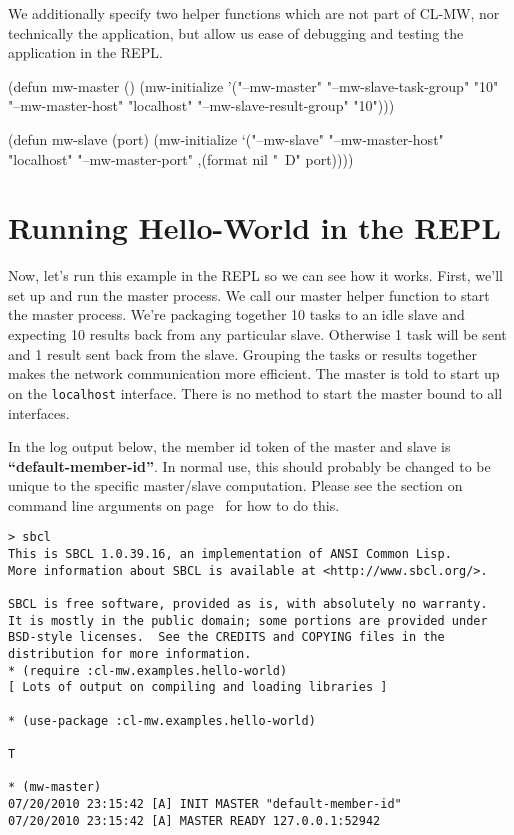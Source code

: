 \documentclass[titlepage,12pt]{book}
\newcommand{\xsmall}{\latexhtml{\small}{}}
\newcommand{\xnormalsize}{\latexhtml{\normalsize}{}}
\newcommand{\clmw}{\xsmall\textsc{CL-MW}\xnormalsize\xspace}
\newcommand{\file}[1]{\texttt{#1}\xspace}
\newcommand{\bold}[1]{\textbf{#1}\xspace}
\begin{document}
We additionally specify two helper functions which are not part of
\clmw, nor technically the application, but allow us ease of debugging
and testing the application in the REPL.

\begin{lisp}[caption=\file{hello-world.lisp: \bold{Part 4 of 4}}]
(defun mw-master ()
  (mw-initialize 
    '("--mw-master" "--mw-slave-task-group" "10"
                    "--mw-master-host" "localhost"
                    "--mw-slave-result-group" "10")))

(defun mw-slave (port)
  (mw-initialize 
    `("--mw-slave" "--mw-master-host" "localhost"
                   "--mw-master-port"
                   ,(format nil "~D" port))))
\end{lisp}

\section{Running Hello-World in the REPL}

Now, let's run this example in the REPL so we can see how it
works. First, we'll set up and run the master process. We call our
master helper function to start the master process.  We're packaging
together 10 tasks to an idle slave and expecting 10 results back from
any particular slave. Otherwise 1 task will be sent and 1 result sent
back from the slave. Grouping the tasks or results together makes the
network communication more efficient.  The master is told to start
up on the \texttt{localhost} interface. There is no method to start
the master bound to all interfaces.

In the log output below, the member id token of the master and
slave is \bold{``default-member-id''}. In normal use, this should
probably be changed to be unique to the specific master/slave
computation. Please see the section on command line arguments on
page~\pageref{command-line-arguments} for how to do this.

\small
\begin{verbatim}
> sbcl
This is SBCL 1.0.39.16, an implementation of ANSI Common Lisp.
More information about SBCL is available at <http://www.sbcl.org/>.

SBCL is free software, provided as is, with absolutely no warranty.
It is mostly in the public domain; some portions are provided under
BSD-style licenses.  See the CREDITS and COPYING files in the
distribution for more information.
* (require :cl-mw.examples.hello-world)
[ Lots of output on compiling and loading libraries ]

* (use-package :cl-mw.examples.hello-world)

T

* (mw-master)
07/20/2010 23:15:42 [A] INIT MASTER "default-member-id"
07/20/2010 23:15:42 [A] MASTER READY 127.0.0.1:52942
\end{verbatim}
\normalsize
\end{document}
